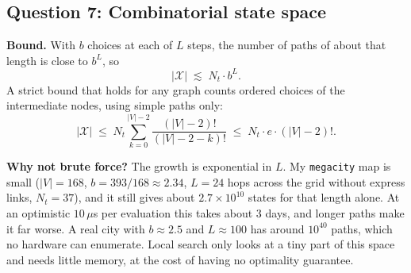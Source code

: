 \documentclass[11pt,a4paper]{article}
\newcommand{\col}[1]{\texttt{#1}}
\begin{document}
\subsection*{Question 7: Combinatorial state space}

\textbf{Bound.} With $b$ choices at each of $L$ steps, the number of paths of about that length is
close to $b^L$, so
\[
|\mathcal{X}| \;\lesssim\; N_t \cdot b^{L} .
\]
A strict bound that holds for any graph counts ordered choices of the intermediate nodes, using
simple paths only:
\[
|\mathcal{X}| \;\le\; N_t \sum_{k=0}^{|V|-2} \frac{(|V|-2)!}{(|V|-2-k)!} \;\le\; N_t \cdot e \cdot (|V|-2)! .
\]

\textbf{Why not brute force?} The growth is exponential in $L$. My \col{megacity} map is small
($|V| = 168$, $b = 393/168 \approx 2.34$, $L = 24$ hops across the grid without express links, $N_t = 37$), and it still
gives about $2.7 \times 10^{10}$ states for that length alone. At an optimistic $10\,\mu$s per evaluation
this takes about 3 days, and longer paths make it far worse. A real city with $b \approx 2.5$ and
$L \approx 100$ has around $10^{40}$ paths, which no hardware can enumerate. Local search only looks at
a tiny part of this space and needs little memory, at the cost of having no optimality guarantee.
\end{document}
